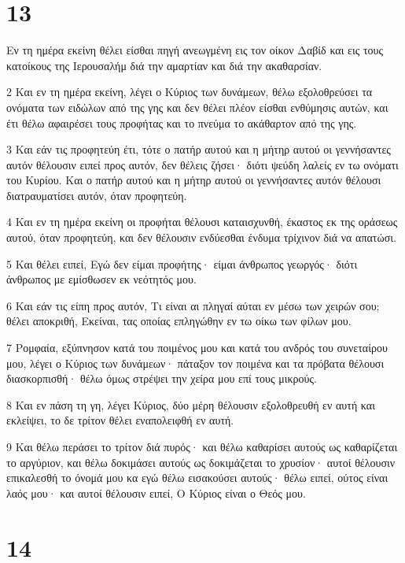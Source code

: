 \chapter{13}

\par Εν τη ημέρα εκείνη θέλει είσθαι πηγή ανεωγμένη εις τον οίκον Δαβίδ και εις τους κατοίκους της Ιερουσαλήμ διά την αμαρτίαν και διά την ακαθαρσίαν.
\par 2 Και εν τη ημέρα εκείνη, λέγει ο Κύριος των δυνάμεων, θέλω εξολοθρεύσει τα ονόματα των ειδώλων από της γης και δεν θέλει πλέον είσθαι ενθύμησις αυτών, και έτι θέλω αφαιρέσει τους προφήτας και το πνεύμα το ακάθαρτον από της γης.
\par 3 Και εάν τις προφητεύη έτι, τότε ο πατήρ αυτού και η μήτηρ αυτού οι γεννήσαντες αυτόν θέλουσιν ειπεί προς αυτόν, δεν θέλεις ζήσει· διότι ψεύδη λαλείς εν τω ονόματι του Κυρίου. Και ο πατήρ αυτού και η μήτηρ αυτού οι γεννήσαντες αυτόν θέλουσι διατραυματίσει αυτόν, όταν προφητεύη.
\par 4 Και εν τη ημέρα εκείνη οι προφήται θέλουσι καταισχυνθή, έκαστος εκ της οράσεως αυτού, όταν προφητεύη, και δεν θέλουσιν ενδύεσθαι ένδυμα τρίχινον διά να απατώσι.
\par 5 Και θέλει ειπεί, Εγώ δεν είμαι προφήτης· είμαι άνθρωπος γεωργός· διότι άνθρωπος με εμίσθωσεν εκ νεότητός μου.
\par 6 Και εάν τις είπη προς αυτόν, Τι είναι αι πληγαί αύται εν μέσω των χειρών σου; θέλει αποκριθή, Εκείναι, τας οποίας επληγώθην εν τω οίκω των φίλων μου.
\par 7 Ρομφαία, εξύπνησον κατά του ποιμένος μου και κατά του ανδρός του συνεταίρου μου, λέγει ο Κύριος των δυνάμεων· πάταξον τον ποιμένα και τα πρόβατα θέλουσι διασκορπισθή· θέλω όμως στρέψει την χείρα μου επί τους μικρούς.
\par 8 Και εν πάση τη γη, λέγει Κύριος, δύο μέρη θέλουσιν εξολοθρευθή εν αυτή και εκλείψει, το δε τρίτον θέλει εναπολειφθή εν αυτή.
\par 9 Και θέλω περάσει το τρίτον διά πυρός· και θέλω καθαρίσει αυτούς ως καθαρίζεται το αργύριον, και θέλω δοκιμάσει αυτούς ως δοκιμάζεται το χρυσίον· αυτοί θέλουσιν επικαλεσθή το όνομά μου κα εγώ θέλω εισακούσει αυτούς· θέλω ειπεί, ούτος είναι λαός μου· και αυτοί θέλουσιν ειπεί, Ο Κύριος είναι ο Θεός μου.

\chapter{14}

